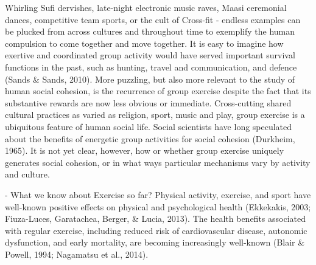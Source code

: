 \documentclass[12pt]{report}
\begin{document}
Whirling Sufi dervishes, late-night electronic music raves, Maasi ceremonial dances, competitive team sports, or the cult of Cross-fit  -  endless examples can be plucked from across cultures and throughout time to exemplify the human compulsion to come together and move together.  It is easy to imagine how exertive and coordinated group activity would have served important survival functions in the past, such as hunting, travel and communication, and defence (Sands & Sands, 2010).  More puzzling, but also more relevant to the study of human social cohesion, is the recurrence of group exercise despite the fact that its substantive rewards are now less obvious or immediate.  Cross-cutting shared cultural practices as varied as religion, sport, music and play, group exercise is a ubiquitous feature of human social life.   Social scientists have long speculated about the benefits of energetic group activities for social cohesion (Durkheim, 1965). It is not yet clear, however, how or whether group exercise uniquely generates social cohesion, or in what ways particular mechanisms vary by activity and culture.



- What we know about Exercise so far?
Physical activity, exercise, and sport have well-known positive effects on physical and  psychological health (Ekkekakis, 2003; Fiuza-Luces, Garatachea, Berger, & Lucia, 2013).
The health benefits associated with regular exercise, including reduced risk of cardiovascular disease, autonomic dysfunction, and early mortality, are becoming increasingly well-known (Blair & Powell, 1994; Nagamatsu et al., 2014).
\end{document}
